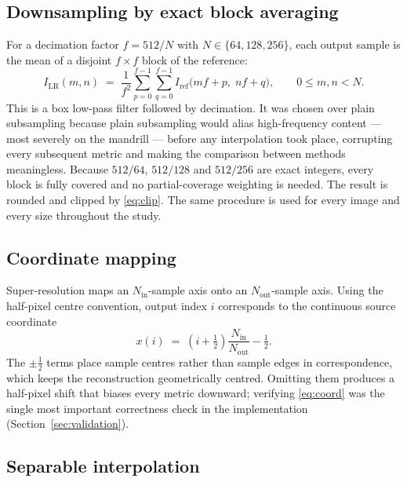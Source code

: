 \documentclass[11pt,a4paper]{article}
\begin{document}
\subsection{Downsampling by exact block averaging}

For a decimation factor $f = 512/N$ with $N \in \{64,128,256\}$, each output sample is the
mean of a disjoint $f \times f$ block of the reference:
\begin{equation}
I_{\text{LR}}(m,n) \;=\; \frac{1}{f^{2}} \sum_{p=0}^{f-1}\sum_{q=0}^{f-1}
I_{\text{ref}}\big(mf + p,\; nf + q\big),
\qquad 0 \le m,n < N.
\label{eq:box}
\end{equation}
This is a box low-pass filter followed by decimation. It was chosen over plain subsampling
because plain subsampling would alias high-frequency content --- most severely on the
mandrill --- before any interpolation took place, corrupting every subsequent metric and
making the comparison between methods meaningless. Because $512/64$, $512/128$ and $512/256$
are exact integers, every block is fully covered and no partial-coverage weighting is needed.
The result is rounded and clipped by \eqref{eq:clip}. The same procedure is used for every
image and every size throughout the study.

\subsection{Coordinate mapping}

Super-resolution maps an $N_{\text{in}}$-sample axis onto an $N_{\text{out}}$-sample axis.
Using the half-pixel centre convention, output index $i$ corresponds to the continuous source
coordinate
\begin{equation}
x(i) \;=\; \left(i + \tfrac{1}{2}\right)\frac{N_{\text{in}}}{N_{\text{out}}} - \tfrac{1}{2}.
\label{eq:coord}
\end{equation}
The $\pm\tfrac{1}{2}$ terms place sample centres rather than sample edges in correspondence,
which keeps the reconstruction geometrically centred. Omitting them produces a half-pixel
shift that biases every metric downward; verifying \eqref{eq:coord} was the single most
important correctness check in the implementation (Section~\ref{sec:validation}).

\subsection{Separable interpolation}
\end{document}
